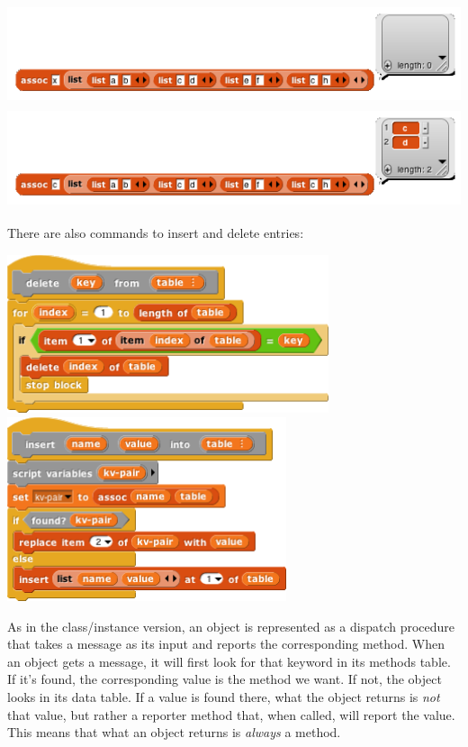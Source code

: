 \includegraphics[width=5.60417in,height=1.15625in]{media/image860.png}\includegraphics[width=5.60417in,height=1.15625in]{media/image861.png}

There are also commands to insert and delete entries:

\includegraphics[width=3.71875in,height=1.82639in]{media/image862.png}\includegraphics[width=3.22917in,height=2.12831in]{media/image863.png}

As in the class/instance version, an object is represented as a dispatch
procedure that takes a message as its input and reports the
corresponding method. When an object gets a message, it will ﬁrst look
for that keyword in its methods table. If it's found, the corresponding
value is the method we want. If not, the object looks in its data table.
If a value is found there, what the object returns is \emph{not} that
value, but rather a reporter method that, when called, will report the
value. This means that what an object returns is \emph{always} a method.

